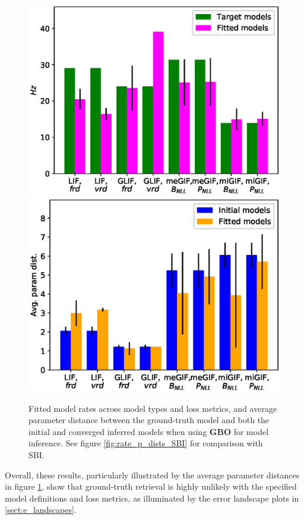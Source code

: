 \documentclass[mphil,deptreport,ianc]{infthesis} %
\begin{document}
\begin{figure}
    \centering
    \vspace{-0.1in}
	\includegraphics[width=0.8\columnwidth]{figures/export_rates_saved_all.eps}
	\includegraphics[width=0.8\columnwidth]{figures/export_p_dists_saved_all.eps}
	\vspace{-0.1in}
	\caption{Fitted model rates across model types and loss metrics, and average parameter distance between the ground-truth model and both the initial and converged inferred models when using \textbf{GBO} for model inference. See figure \ref{fig:rate_p_dists_SBI} for comparison with SBI.}
	\label{fig:rate_p_dists_GBO}
\end{figure}

Overall, these results, particularly illustrated by the average parameter distances in figure \ref{fig:rate_p_dists_GBO}, show that ground-truth retrieval is highly unlikely with the specified model definitions and loss metrics, as illuminated by the error landscape plots in \ref{sect:e_landscapes}.
\end{document}
